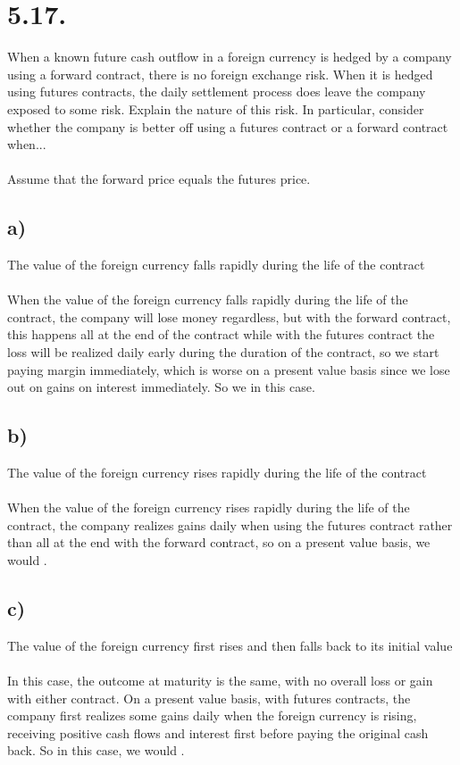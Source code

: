 \documentclass{article}
\begin{document}
{\Large 

\section*{5.17.}
When a known future cash outflow in a foreign currency is hedged by a company using a forward contract, there is no foreign exchange risk. When it is hedged using futures contracts, the daily settlement process does leave the company exposed to some risk. Explain the nature of this risk. In particular, consider whether the company is better off using a futures contract or a forward contract when... \\ \\
Assume that the forward price equals the futures price. \\

\subsection*{a)} 
The value of the foreign currency falls rapidly during the life of the contract \\ \\
When the value of the foreign currency falls rapidly during the life of the contract, the company will lose money regardless, but with the forward contract, this happens all at the end of the contract while with the futures contract the loss will be realized daily early during the duration of the contract, so we start paying margin immediately, which is worse on a present value basis since we lose out on gains on interest immediately. So we  in this case. 

\subsection*{b)}
The value of the foreign currency rises rapidly during the life of the contract \\ \\
When the value of the foreign currency rises rapidly during the life of the contract, the company realizes gains daily when using the futures contract rather than all at the end with the forward contract, so on a present value basis, we would .

\subsection*{c)}
The value of the foreign currency first rises and then falls back to its initial value \\ \\
In this case, the outcome at maturity is the same, with no overall loss or gain with either contract. On a present value basis, with futures contracts, the company first realizes some gains daily when the foreign currency is rising, receiving positive cash flows and interest first before paying the original cash back. So in this case, we would .

}
\end{document}
